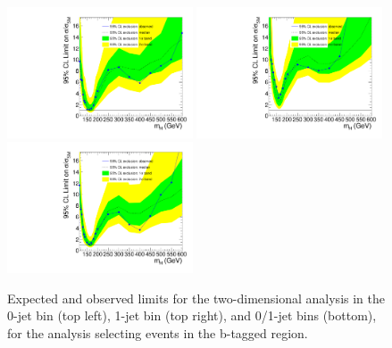 \begin{figure}[hbt]
\begin{center}
  \includegraphics[width=0.49\textwidth]{figures/limits8TeV_ofshape0_HCP_2D_BTAG.pdf}
  \includegraphics[width=0.49\textwidth]{figures/limits8TeV_ofshape1_HCP_2D_BTAG.pdf}
  \includegraphics[width=0.49\textwidth]{figures/limits8TeV_ofshape_HCP_2D_BTAG.pdf}
\caption{\label{fig:limits8TeV_ofshapeN_HCP_2D_BTAG}\protect Expected and observed limits for the two-dimensional 
analysis in the 0-jet bin (top left), 1-jet bin (top right), and 0/1-jet bins (bottom), for 
the analysis selecting events in the b-tagged region.}
\end{center}
\end{figure}


